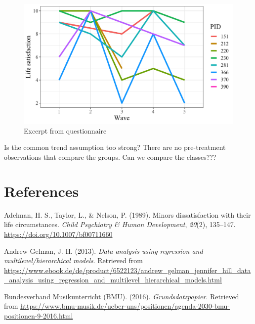 \documentclass[a4, 12pt]{article}
\begin{document}
\begin{figure}[H]

{\centering \includegraphics[width=0.8\linewidth,]{../figures/random_lsat} 

}

\caption{Excerpt from questionnaire}\label{fig:random-pid}
\end{figure}

Is the common trend assumption too strong? There are no pre-treatment observations that compare the groups. Can we compare the classes???

\clearpage

\hypertarget{references}{%
\section*{References}\label{references}}

\singlespacing

\setlength{\parindent}{-0.5in}
\setlength{\leftskip}{0.5in}
\setlength{\parskip}{8pt}

\noindent

\hypertarget{refs}{}
\leavevmode\hypertarget{ref-Adelman1989}{}%
Adelman, H. S., Taylor, L., \& Nelson, P. (1989). Minors dissatisfaction with their life circumstances. \emph{Child Psychiatry \& Human Development}, \emph{20}(2), 135--147. \url{https://doi.org/10.1007/bf00711660}

\leavevmode\hypertarget{ref-AndrewGelman2013}{}%
Andrew Gelman, J. H. (2013). \emph{Data analysis using regression and multilevel/hierarchical models}. Retrieved from \url{https://www.ebook.de/de/product/6522123/andrew_gelman_jennifer_hill_data_analysis_using_regression_and_multilevel_hierarchical_models.html}

\leavevmode\hypertarget{ref-BundesverbandMusikunterricht}{}%
Bundesverband Musikunterricht (BMU). (2016). \emph{Grundsdatzpapier}. Retrieved from \url{https://www.bmu-musik.de/ueber-uns/positionen/agenda-2030-bmu-positionen-9-2016.html}
\end{document}
